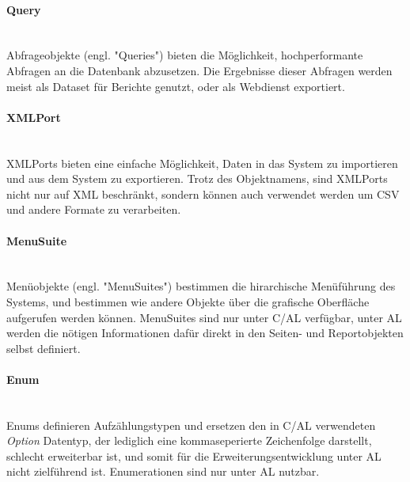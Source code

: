 \paragraph{Query} \mbox{}\\
Abfrageobjekte (engl. "Queries") bieten die Möglichkeit, hochperformante Abfragen an die Datenbank abzusetzen. Die Ergebnisse dieser Abfragen werden meist als Dataset für Berichte genutzt, oder als Webdienst exportiert.

\paragraph{XMLPort}\mbox{}\\
XMLPorts bieten eine einfache Möglichkeit, Daten in das System zu importieren und aus dem System zu exportieren. Trotz des Objektnamens, sind XMLPorts nicht nur auf XML beschränkt, sondern können auch verwendet werden um CSV und andere Formate zu verarbeiten.

\paragraph{MenuSuite}\mbox{}\\
Menüobjekte (engl. "MenuSuites") bestimmen die hirarchische Menüführung des Systems, und bestimmen wie andere Objekte über die grafische Oberfläche aufgerufen werden können. MenuSuites sind nur unter C/AL verfügbar, unter AL werden die nötigen Informationen dafür direkt in den Seiten- und Reportobjekten selbst definiert.


\paragraph{Enum}\mbox{}\\
Enums definieren Aufzählungstypen und ersetzen den in C/AL verwendeten \textit{Option} Datentyp, der lediglich eine kommaseperierte Zeichenfolge darstellt, schlecht erweiterbar ist, und somit für die Erweiterungsentwicklung unter AL nicht zielführend ist. Enumerationen sind nur unter AL nutzbar.




























